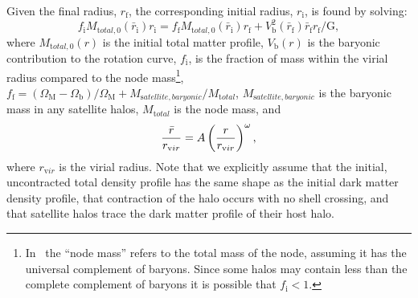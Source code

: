 Given the final radius, $r_{\mathrm f}$, the corresponding initial radius, $r_{\mathrm i}$, is found by solving:
\begin{equation}
f_{\mathrm i} M_{\mathrm total,0}(\bar{r}_{\mathrm i}) r_{\mathrm i} = f_{\mathrm f} M_{\mathrm total,0}(\bar{r}_{\mathrm i}) r_{\mathrm f} + V^2_{\mathrm b}(\bar{r}_{\mathrm f}) \bar{r}_{\mathrm f} r_{\mathrm f}/ {\mathrm G},
 \label{eq:adiabaticContractionGnedinSolution}
\end{equation}
where $M_{\mathrm total,0}(r)$ is the initial total matter profile, $V_{\mathrm b}(r)$ is the baryonic contribution to the rotation curve, $f_{\mathrm i}$, is the fraction of mass within the virial radius compared to the node mass\footnote{In \protect\glc\ the ``node mass'' refers to the total mass of the node, assuming it has the universal complement of baryons. Since some halos may contain less than the complete complement of baryons it is possible that $f_{\mathrm i}<1$.}, $f_{\mathrm f}=(\Omega_{\mathrm M}-\Omega_{\mathrm b})/\Omega_{\mathrm M}+M_{\mathrm satellite, baryonic}/M_{\mathrm total}$, $M_{\mathrm satellite, baryonic}$ is the baryonic mass in any satellite halos, $M_{\mathrm total}$ is the node mass, and
\begin{equation}
{\bar{r} \over r_{\mathrm vir}} = A \left({r \over r_{\mathrm vir}}\right)^\omega,
\end{equation}
where $r_{\mathrm vir}$ is the virial radius. Note that we explicitly assume that the initial, uncontracted total density profile has the same shape as the initial dark matter density profile, that contraction of the halo occurs with no shell crossing, and that satellite halos trace the dark matter profile of their host halo.

